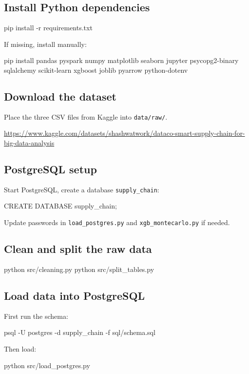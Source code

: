 \documentclass[12pt, a4paper]{report}
\begin{document}
\subsection{Install Python dependencies}
\begin{codebox}
pip install -r requirements.txt
\end{codebox}
If missing, install manually:
\begin{codebox}
pip install pandas pyspark numpy matplotlib seaborn jupyter psycopg2-binary sqlalchemy scikit-learn xgboost joblib pyarrow python-dotenv
\end{codebox}

\subsection{Download the dataset}
Place the three CSV files from Kaggle into \texttt{data/raw/}.
{\small\raggedright
\url{https://www.kaggle.com/datasets/shashwatwork/dataco-smart-supply-chain-for-big-data-analysis}
\par}

\subsection{PostgreSQL setup}
Start PostgreSQL, create a database \texttt{supply\_chain}:
\begin{codebox}
CREATE DATABASE supply\_chain;
\end{codebox}
Update passwords in \texttt{load\_postgres.py} and \texttt{xgb\_montecarlo.py} if needed.

\subsection{Clean and split the raw data}
\begin{codebox}
python src/cleaning.py
python src/split\_tables.py
\end{codebox}

\subsection{Load data into PostgreSQL}
First run the schema:
\begin{codebox}
psql -U postgres -d supply\_chain -f sql/schema.sql
\end{codebox}
Then load:
\begin{codebox}
python src/load\_postgres.py
\end{codebox}
\end{document}
